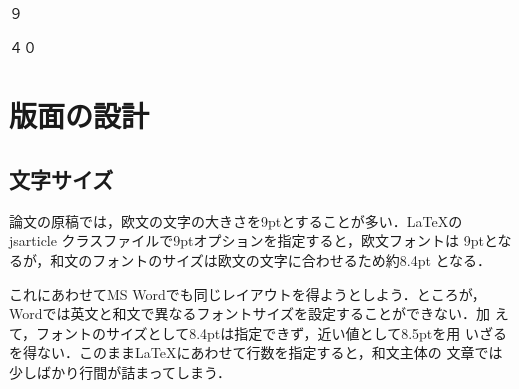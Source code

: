 \documentclass[a4j, twocolumn, twoside, draft]{jsarticle}
\begin{document}
９\par \noindent ４０\par

\section{版面の設計}



\subsection{文字サイズ}

  論文の原稿では，欧文の文字の大きさを9ptとすることが多い．\LaTeX の
  jsarticle クラスファイルで9ptオプションを指定すると，欧文フォントは
  9ptとなるが，和文のフォントのサイズは欧文の文字に合わせるため約8.4pt
  となる．

  これにあわせてMS Wordでも同じレイアウトを得ようとしよう．ところが，
  Wordでは英文と和文で異なるフォントサイズを設定することができない．加
  えて，フォントのサイズとして8.4ptは指定できず，近い値として8.5ptを用
  いざるを得ない．このまま\LaTeX にあわせて行数を指定すると，和文主体の
  文章では少しばかり行間が詰まってしまう．
\end{document}
